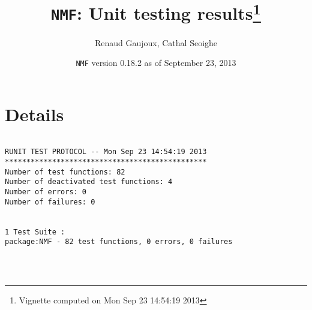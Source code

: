 \documentclass[10pt]{article}\usepackage[]{graphicx}\usepackage[]{color}
\author{Renaud Gaujoux, Cathal Seoighe}
\title{\texttt{NMF}: Unit testing results\footnote{Vignette computed  on Mon Sep 23 14:54:19 2013}}
\date{\texttt{NMF} version 0.18.2 as of September 23, 2013}
\begin{document}
\maketitle

\section{Details}
\begin{verbatim}

RUNIT TEST PROTOCOL -- Mon Sep 23 14:54:19 2013 
*********************************************** 
Number of test functions: 82 
Number of deactivated test functions: 4 
Number of errors: 0 
Number of failures: 0 

 
1 Test Suite : 
package:NMF - 82 test functions, 0 errors, 0 failures




\end{verbatim}
\end{document}
